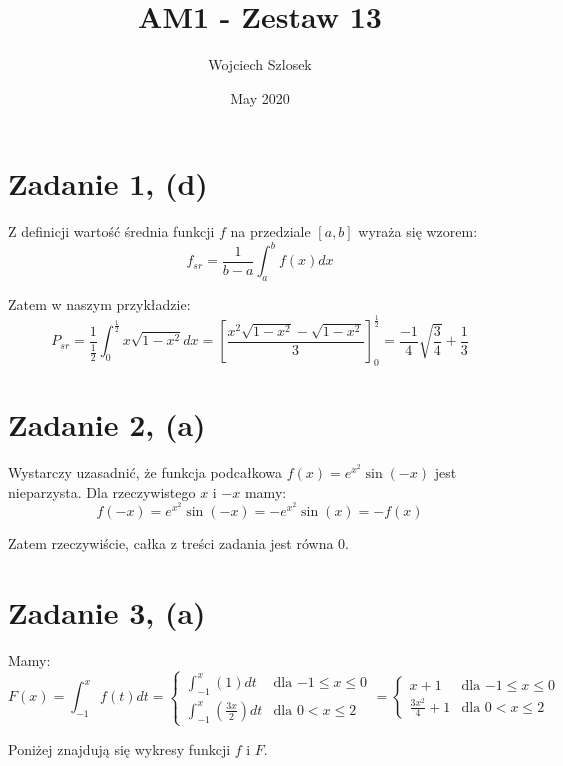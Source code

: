 \documentclass{article}
\title{AM1 - Zestaw 13}
\author{Wojciech Szlosek}
\date{May 2020}
\begin{document}
\maketitle

\section{Zadanie 1, (d)}

Z definicji wartość średnia funkcji $f$ na przedziale $[a,b]$ wyraża się wzorem:
$$f_{sr} = \frac{1}{b-a} \int^{b}_{a}f(x)dx$$

Zatem w naszym przykładzie:
$$P_{sr} = \frac{1}{\frac{1}{2}}\int^{\frac{1}{2}}_{0}x\sqrt{1-x^2} dx = [\frac{x^{2}\sqrt{1-x^2}-\sqrt{1-x^2}}{3}]^{\frac{1}{2}}_{0} =\frac{-1}{4} \sqrt{\frac{3}{4}} + \frac{1}{3} $$

\section{Zadanie 2, (a)}

Wystarczy uzasadnić, że funkcja podcałkowa $f(x) = e^{x^{2}} \sin(-x)$ jest nieparzysta. Dla rzeczywistego $x$ i $-x$ mamy:
$$f(-x) = e^{x^{2}} \sin(-x) = -e^{x^2}\sin(x) = -f(x)$$

Zatem rzeczywiście, całka z treści zadania jest równa 0.

\section{Zadanie 3, (a)}

Mamy:
$$F(x) = \int^{x}_{-1}f(t) dt = \left\{ \begin{array}{rl}
\int^{x}_{-1} (1) dt & \textrm{dla $-1 \leq x \leq 0$} \\ \int^{x}_{-1} (\frac{3x}{2}) dt & \textrm{dla $0 < x \leq 2$} \end{array} = \left\{ \begin{array}{rl}
x+1 & \textrm{dla $-1 \leq x \leq 0$} \\ \frac{3x^2}{4}+1 & \textrm{dla $0 < x \leq 2$} \end{array}$$

Poniżej znajdują się wykresy funkcji $f$ i $F$.

\end{document}
